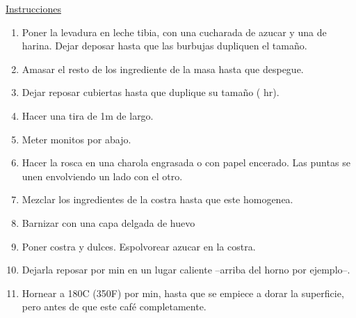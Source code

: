 \underline{Instrucciones}
\begin{enumerate}
\item Poner la levadura en leche tibia, con una cucharada de azucar y una de harina. Dejar deposar hasta que las burbujas dupliquen el tamaño.
\item Amasar el resto de los ingrediente de la masa hasta que despegue.
\item Dejar reposar cubiertas hasta que duplique su tamaño ( hr).
\item Hacer una tira de 1m de largo.
\item Meter monitos por abajo.
\item Hacer la rosca en una charola engrasada o con papel encerado. Las puntas se unen envolviendo un lado con el otro.
\item Mezclar los ingredientes de la costra hasta que este homogenea.
\item Barnizar con una capa delgada de huevo
\item Poner costra y dulces. Espolvorear azucar en la costra.
\item Dejarla reposar por  min en un lugar caliente --arriba del horno por ejemplo--.
\item Hornear a 180C (350F) por  min, hasta que se empiece a dorar la superficie, pero antes de que este café completamente.
\end{enumerate}
